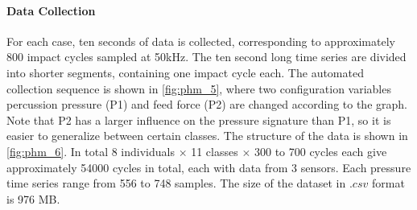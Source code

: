 \paragraph{Data Collection}


For each case, ten seconds of data is collected, corresponding to approximately 800 impact cycles sampled at 50kHz. The ten second long time series are divided into shorter segments, containing one impact cycle each. 
The automated collection sequence is shown in \cref{fig:phm_5}, where two configuration variables percussion pressure (P1) and feed force (P2) are changed according to the graph. %
Note that P2 has a larger influence on the pressure signature than P1, so it is easier to generalize between certain classes.
The structure of the data is shown in \cref{fig:phm_6}. In total 8 individuals $\times$ 11 classes $\times$ 300 to 700 cycles each give approximately 54000 cycles in total, each with data from 3 sensors. Each pressure time series range from 556 to 748 samples. The size of the dataset in $.csv$ format is 976 MB. 


